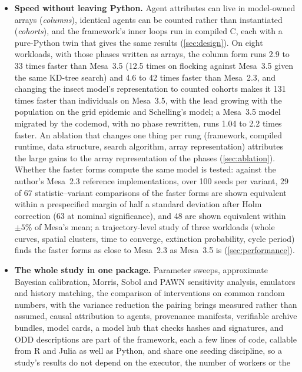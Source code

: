 \begin{itemize}[leftmargin=*,itemsep=2pt]
  \item \textbf{Speed without leaving Python.} Agent attributes can live in model-owned
   arrays (\emph{columns}), identical agents can be counted rather than
  instantiated (\emph{cohorts}), and the framework's inner loops run in compiled C, each with a
  pure-Python twin that gives the same results (\cref{sec:design}). On eight workloads, with
  those phases written as arrays, the column form runs 2.9 to 33 times faster than Mesa~3.5
  (12.5 times on flocking against Mesa~3.5 given the same KD-tree search) and 4.6 to 42 times
  faster than Mesa~2.3, and changing the insect model's representation to counted cohorts makes
  it 131 times faster than individuals on Mesa~3.5, with the
  lead growing with the population on the grid epidemic and Schelling's model; a Mesa~3.5 model migrated by the codemod, with no phase
  rewritten, runs 1.04 to 2.2 times faster. An ablation that changes one thing per rung
  (framework, compiled runtime, data structure, search algorithm, array representation)
  attributes the large gains to the array representation of the phases
  (\cref{sec:ablation}). Whether the faster forms compute the same model is tested: against
  the author's Mesa~2.3 reference implementations, over 100 seeds per variant, 29 of 67
  statistic--variant comparisons of the faster forms are shown equivalent within a prespecified
  margin of half a standard deviation after Holm correction (63 at nominal significance), and
  48 are shown equivalent within $\pm 5\%$ of Mesa's mean; a trajectory-level study of three
  workloads (whole curves, spatial clusters, time to converge, extinction probability,
  cycle period) finds the faster forms as close to Mesa~2.3 as Mesa~3.5 is
  (\cref{sec:performance}).
  \item \textbf{The whole study in one package.} Parameter sweeps, approximate Bayesian
  calibration, Morris, Sobol and PAWN sensitivity analysis, emulators and history matching,
  the comparison of interventions on common random numbers, with the variance reduction the
  pairing brings measured rather than assumed, causal attribution to agents, provenance
  manifests, verifiable archive bundles, model cards, a model hub that checks hashes and
  signatures, and ODD descriptions \citep{grimm2006odd,
  grimm2020odd} are part of the framework, each a few lines of code, callable from R and Julia
  as well as Python, and share one seeding
  discipline, so a study's results do not depend on the executor, the number of workers or the

\end{itemize}
